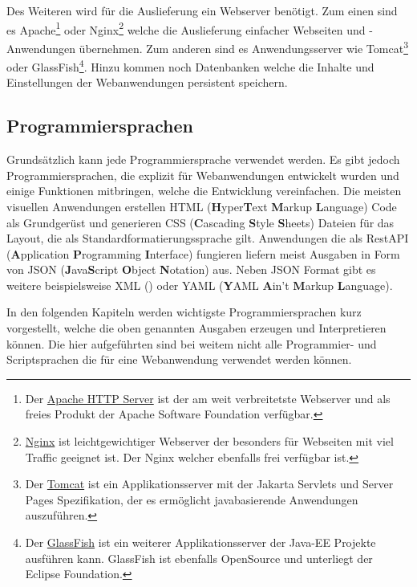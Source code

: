 Des Weiteren wird für die Auslieferung ein Webserver benötigt. Zum einen sind es Apache\footnote{Der \href{https://httpd.apache.org/download.cgi}{Apache HTTP Server} ist der am weit verbreitetste Webserver und als freies Produkt der Apache Software Foundation verfügbar.} oder Nginx\footnote{\href{https://nginx.org/en/}{Nginx} ist leichtgewichtiger Webserver der besonders für Webseiten mit viel Traffic geeignet ist. Der Nginx welcher ebenfalls frei verfügbar ist.} welche die Auslieferung einfacher Webseiten und -Anwendungen übernehmen. Zum anderen sind es Anwendungsserver wie Tomcat\footnote{Der \href{https://tomcat.apache.org/}{Tomcat} ist ein Applikationsserver mit der Jakarta Servlets und Server Pages Spezifikation, der es ermöglicht javabasierende Anwendungen auszuführen.} oder GlassFish\footnote{Der \href{https://glassfish.org/}{GlassFish} ist ein weiterer Applikationsserver der Java-EE Projekte ausführen kann. GlassFish ist ebenfalls OpenSource und unterliegt der Eclipse Foundation.}. Hinzu kommen noch Datenbanken welche die Inhalte und Einstellungen der Webanwendungen persistent speichern.


\subsection{Programmiersprachen}
Grundsätzlich kann jede Programmiersprache verwendet werden. Es gibt jedoch Programmiersprachen, die explizit für Webanwendungen entwickelt wurden und einige Funktionen mitbringen, welche die Entwicklung vereinfachen. Die meisten visuellen Anwendungen erstellen HTML (\textbf{H}yper\textbf{T}ext \textbf{M}arkup \textbf{L}anguage) Code als Grundgerüst und generieren CSS (\textbf{C}ascading \textbf{S}tyle \textbf{S}heets) Dateien für das Layout, die als Standardformatierungssprache gilt. Anwendungen die als RestAPI (\textbf{A}pplication \textbf{P}rogramming \textbf{I}nterface) fungieren liefern meist Ausgaben in Form von JSON (\textbf{J}ava\textbf{S}cript \textbf{O}bject \textbf{N}otation) aus. Neben JSON Format gibt es weitere beispielsweise XML () oder YAML (\textbf{Y}AML \textbf{A}in’t \textbf{M}arkup \textbf{L}anguage).\vspace{0.2cm}

In den folgenden Kapiteln werden wichtigste Programmiersprachen kurz vorgestellt, welche die oben genannten Ausgaben erzeugen und Interpretieren können. Die hier aufgeführten sind bei weitem nicht alle Programmier- und Scriptsprachen die für eine Webanwendung verwendet werden können.


